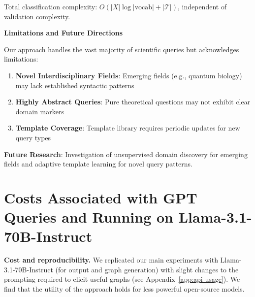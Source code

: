 \documentclass{uai2026} %
\theoremstyle{remark}
\theoremstyle{plain}
\theoremstyle{definition}
\begin{document}
Total classification complexity: $O(|X| \log |\text{vocab}| + |\mathcal{T}|)$, independent of validation complexity.

\textbf{Limitations and Future Directions}

Our approach handles the vast majority of scientific queries but acknowledges limitations:

\begin{enumerate}
\item \textbf{Novel Interdisciplinary Fields}: Emerging fields (e.g., quantum biology) may lack established syntactic patterns
\item \textbf{Highly Abstract Queries}: Pure theoretical questions may not exhibit clear domain markers
\item \textbf{Template Coverage}: Template library requires periodic updates for new query types
\end{enumerate}

\textbf{Future Research}: Investigation of unsupervised domain discovery for emerging fields and adaptive template learning for novel query patterns.


\section{Costs Associated with GPT Queries and Running on Llama-3.1-70B-Instruct}
\label{app:costs}

\textbf{Cost and reproducibility.} We replicated our main experiments with Llama-3.1-70B-Instruct (for output and graph generation) with slight changes to the prompting required to elicit useful graphs (see Appendix~\ref{app:api-usage}). We find that the utility of the approach holds for less powerful open-source models.
\end{document}
